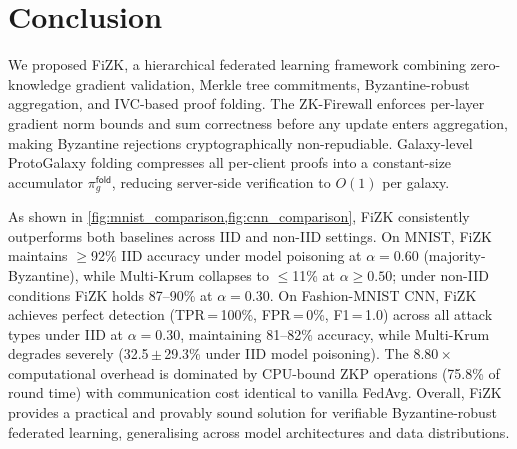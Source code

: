 \documentclass[10pt,twocolumn,letterpaper]{article}
\begin{document}
\section{Conclusion}
\label{sec:conc}

We proposed FiZK, a hierarchical federated learning framework combining zero-knowledge gradient validation, Merkle tree commitments, Byzantine-robust aggregation, and IVC-based proof folding. The ZK-Firewall enforces per-layer gradient norm bounds and sum correctness before any update enters aggregation, making Byzantine rejections cryptographically non-repudiable. Galaxy-level ProtoGalaxy folding compresses all per-client proofs into a constant-size accumulator $\pi_g^{\mathsf{fold}}$, reducing server-side verification to $O(1)$ per galaxy.

As shown in \cref{fig:mnist_comparison,fig:cnn_comparison}, FiZK consistently outperforms both baselines across IID and non-IID settings. On MNIST, FiZK maintains $\geq$92\% IID accuracy under model poisoning at $\alpha=0.60$ (majority-Byzantine), while Multi-Krum collapses to $\leq$11\% at $\alpha\geq0.50$; under non-IID conditions FiZK holds 87--90\% at $\alpha=0.30$. On Fashion-MNIST CNN, FiZK achieves perfect detection (TPR\,=\,100\%, FPR\,=\,0\%, F1\,=\,1.0) across all attack types under IID at $\alpha=0.30$, maintaining 81--82\% accuracy, while Multi-Krum degrades severely (32.5\,$\pm$\,29.3\% under IID model poisoning). The $8.80\times$ computational overhead is dominated by CPU-bound ZKP operations (75.8\% of round time) with communication cost identical to vanilla FedAvg. Overall, FiZK provides a practical and provably sound solution for verifiable Byzantine-robust federated learning, generalising across model architectures and data distributions.

{
    \small
    
    
}

% 

\end{document}

